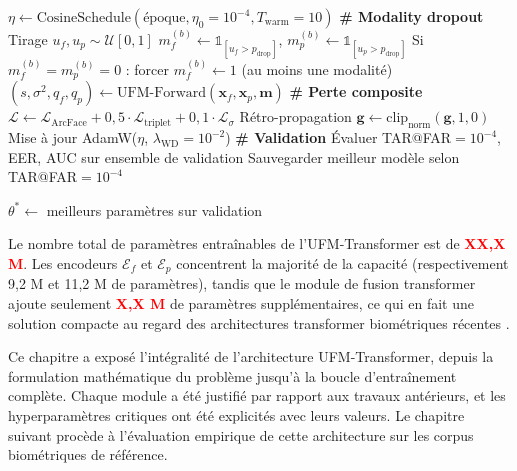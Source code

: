 \documentclass[12pt,a4paper]{report}
\begin{document}
\begin{algorithm}[htbp]
\begin{algorithmic}[1]
    \STATE $\eta \leftarrow \text{CosineSchedule}(\text{\'{e}poque}, \eta_0 = 10^{-4}, T_{\text{warm}} = 10)$
        \STATE \textbf{\# Modality dropout}
            \STATE Tirage $u_f, u_p \sim \mathcal{U}[0,1]$
            \STATE $m_f^{(b)} \leftarrow \mathbb{1}_{[u_f > p_{\text{drop}}]}$, $m_p^{(b)} \leftarrow \mathbb{1}_{[u_p > p_{\text{drop}}]}$
            \STATE Si $m_f^{(b)} = m_p^{(b)} = 0$ : forcer $m_f^{(b)} \leftarrow 1$ (au moins une modalit\'{e})
        \ENDFOR
        \STATE $(s, \sigma^2, q_f, q_p) \leftarrow \text{UFM-Forward}(\mathbf{x}_f, \mathbf{x}_p, \mathbf{m})$
        \STATE \textbf{\# Perte composite}
        \STATE $\mathcal{L} \leftarrow \mathcal{L}_{\text{ArcFace}} + 0{,}5 \cdot \mathcal{L}_{\text{triplet}} + 0{,}1 \cdot \mathcal{L}_{\sigma}$
        \STATE R\'{e}tro-propagation
        \STATE $\mathbf{g} \leftarrow \text{clip}_{\text{norm}}(\mathbf{g}, 1{,}0)$
        \STATE Mise \`{a} jour AdamW($\eta$, $\lambda_{\text{WD}} = 10^{-2}$)
    \ENDFOR
    \STATE \textbf{\# Validation}
    \STATE \'{E}valuer TAR@FAR$=10^{-4}$, EER, AUC sur ensemble de validation
    \STATE Sauvegarder meilleur mod\`{e}le selon TAR@FAR$=10^{-4}$
\ENDFOR

\RETURN $\theta^* \leftarrow$ meilleurs param\`{e}tres sur validation
\end{algorithmic}
\end{algorithm}

Le nombre total de param\`{e}tres entra\^{i}nables de l'UFM-Transformer est de \textcolor{red}{\textbf{XX,X M}}. %
Les encodeurs $\mathcal{E}_f$ et $\mathcal{E}_p$ concentrent la majorit\'{e} de la capacit\'{e} (respectivement 9,2 M et 11,2 M de param\`{e}tres), tandis que le module de fusion transformer ajoute seulement \textcolor{red}{\textbf{X,X M}} de param\`{e}tres suppl\'{e}mentaires, ce qui en fait une solution compacte au regard des architectures transformer biom\'{e}triques r\'{e}centes \cite{grosz2024afrnet, talreja2021deephashing}.

Ce chapitre a expos\'{e} l'int\'{e}gralit\'{e} de l'architecture UFM-Transformer, depuis la formulation math\'{e}matique du probl\`{e}me jusqu'\`{a} la boucle d'entra\^{i}nement compl\`{e}te. Chaque module a \'{e}t\'{e} justifi\'{e} par rapport aux travaux ant\'{e}rieurs, et les hyperparam\`{e}tres critiques ont \'{e}t\'{e} explicit\'{e}s avec leurs valeurs. Le chapitre suivant proc\`{e}de \`{a} l'\'{e}valuation empirique de cette architecture sur les corpus biom\'{e}triques de r\'{e}f\'{e}rence.
\end{document}
